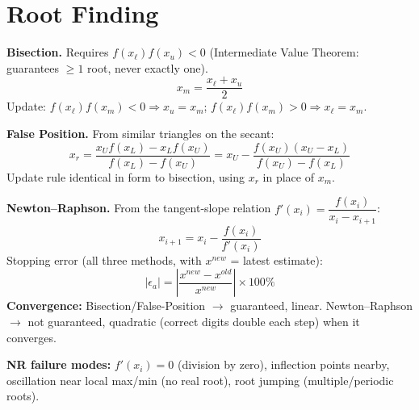 \section{Root Finding}

\begin{formulabox}
\textbf{Bisection.} Requires $f(x_\ell)f(x_u)<0$ (Intermediate Value Theorem: guarantees $\ge1$ root, never exactly one).
\[
x_m = \frac{x_\ell+x_u}{2}
\]
Update: $f(x_\ell)f(x_m)<0 \Rightarrow x_u=x_m$; $f(x_\ell)f(x_m)>0 \Rightarrow x_\ell = x_m$.

\textbf{False Position.} From similar triangles on the secant:
\[
x_r = \frac{x_U f(x_L) - x_L f(x_U)}{f(x_L)-f(x_U)} = x_U - \frac{f(x_U)(x_U-x_L)}{f(x_U)-f(x_L)}
\]
Update rule identical in form to bisection, using $x_r$ in place of $x_m$.

\textbf{Newton--Raphson.} From the tangent-slope relation $f'(x_i)=\dfrac{f(x_i)}{x_i-x_{i+1}}$:
\[
x_{i+1} = x_i - \frac{f(x_i)}{f'(x_i)}
\]
Stopping error (all three methods, with $x^{new}$ = latest estimate):
\[
|\epsilon_a| = \left|\frac{x^{new}-x^{old}}{x^{new}}\right|\times100\%
\]
\textbf{Convergence:} Bisection/False-Position $\to$ guaranteed, linear. Newton--Raphson $\to$ not guaranteed, quadratic (correct digits double each step) when it converges.

\textbf{NR failure modes:} $f'(x_i)=0$ (division by zero), inflection points nearby, oscillation near local max/min (no real root), root jumping (multiple/periodic roots).
\end{formulabox}
